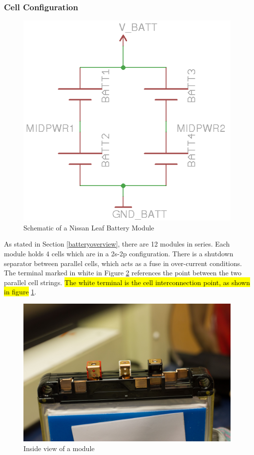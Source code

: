 \documentclass{article}
\DeclareRobustCommand{\hlr}[1]{{\sethlcolor{red}\hl{#1}}}
\begin{document}
        \subsubsection{Cell Configuration} \label{cellconfiguration}


            \begin{figure}[H]
            \centering
            \includegraphics{moduleschem}
            \caption{Schematic of a Nissan Leaf Battery Module}
            \label{module}
            \end{figure}

            As stated in Section \ref{batteryoverview}, there are 12 modules in series. Each module holds 4 cells which are in a 2s-2p configuration. There is a shutdown separator between parallel cells, which acts as a fuse in over-current conditions. The terminal marked in white in Figure \ref{canopener} references the point between the two parallel cell strings. \hlr{The white terminal is the cell interconnection point, as shown in figure} \ref{module}.

            \begin{figure}[H]
            \centering
            \includegraphics[width = 0.6 \textwidth]{OpenModule}
            \caption{Inside view of a module}
            \label{canopener}
            \end{figure}
\end{document}

